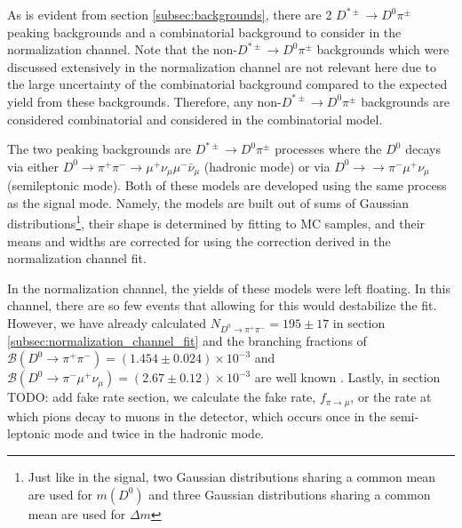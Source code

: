 As is evident from section \ref{subsec:backgrounds}, there are 2 $D^{*\pm} \to D^0 \pi^\pm$ peaking backgrounds and a combinatorial background to consider in the normalization channel. Note that the non-$D^{*\pm} \to D^0 \pi^\pm$ backgrounds which were discussed extensively in the normalization channel are not relevant here due to the large uncertainty of the combinatorial background compared to the expected yield from these backgrounds. Therefore, any non-$D^{*\pm} \to D^0 \pi^\pm$ backgrounds are considered combinatorial and considered in the combinatorial model.

The two peaking backgrounds are $D^{*\pm} \to D^0 \pi^\pm$ processes where the $D^0$ decays via either $D^0 \to \pi^+ \pi^- \to \mu^+ \nu_\mu \mu^- \bar{\nu}_\mu$ (hadronic mode) or via $D^0 \to \to \pi^- \mu^+ \nu_\mu$ (semileptonic mode). Both of these models are developed using the same process as the signal mode. Namely, the models are built out of sums of Gaussian distributions\footnote{Just like in the signal, two Gaussian distributions sharing a common mean are used for $m(D^0)$ and three Gaussian distributions sharing a common mean are used for $\Delta m$}, their shape is determined by fitting to MC samples, and their means and widths are corrected for using the correction derived in the normalization channel fit. 

In the normalization channel, the yields of these models were left floating. In this channel, there are so few events that allowing for this would destabilize the fit. However, we have already calculated $N_{D^0 \to \pi^+ \pi^-} = 195 \pm 17$ in section \ref{subsec:normalization_channel_fit} and the branching fractions of $\mathcal{B}(D^0 \to \pi^+ \pi^-) = (1.454 \pm 0.024) \times 10^{-3}$ and $\mathcal{B}(D^0 \to \pi^-\mu^+ \nu_\mu) = (2.67 \pm 0.12) \times 10^{-3}$ are well known \cite{ref:pdg2024}. Lastly, in section TODO: add fake rate section, we calculate the fake rate, $f_{\pi \to \mu}$, or the rate at which pions decay to muons in the detector, which occurs once in the semi-leptonic mode and twice in the hadronic mode.

